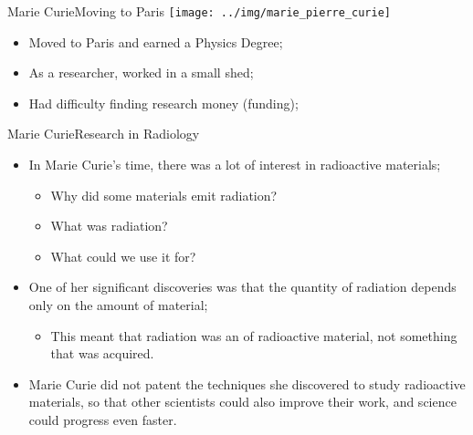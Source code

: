 \begin{frame}{Marie Curie}{Moving to Paris}
  \hfill\texttt{[image: ../img/marie\_pierre\_curie]}
  \begin{itemize}
    \item Moved to Paris and earned a Physics Degree;

    \item As a researcher, worked in a small shed;
    \item Had difficulty finding research money (funding);
  \end{itemize}
\end{frame}

\begin{frame}{Marie Curie}{Research in Radiology}
  \begin{itemize}
    \item In Marie Curie's time, there was a lot of interest in radioactive materials;
    \begin{itemize}
      \item Why did some materials emit radiation?
      \item What was radiation?
      \item What could we use it for?
    \end{itemize}\bigskip

    \item One of her significant discoveries was that the quantity of radiation depends only on the amount of material;
    \begin{itemize}
      \item This meant that radiation was an  of radioactive material, not something that was acquired.
    \end{itemize}\bigskip

    \item Marie Curie did not patent the techniques she discovered to study radioactive materials, so that other scientists could also improve their work, and science could progress even faster.
  \end{itemize}
\end{frame}

